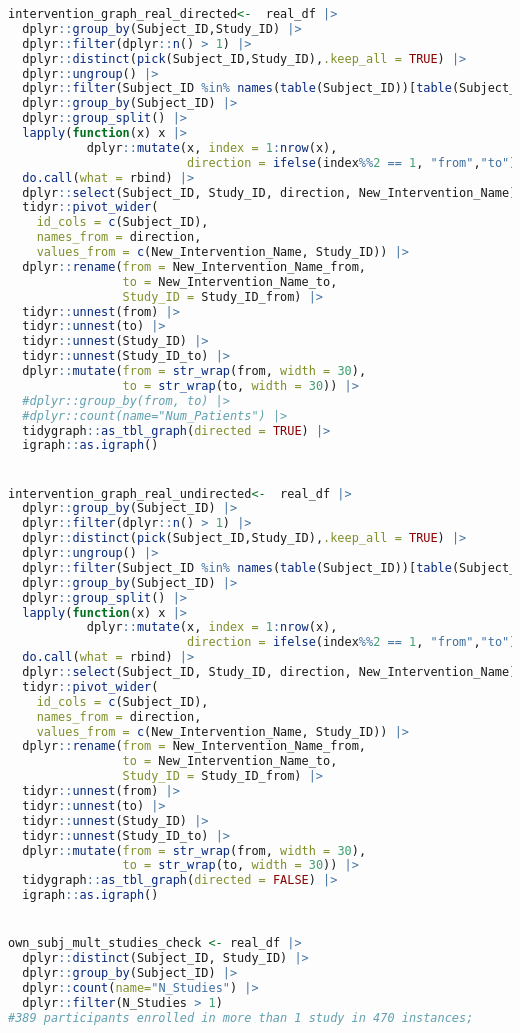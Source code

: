 \documentclass{article}
\begin{document}
\begin{lstlisting}[language=R]
intervention_graph_real_directed<-  real_df |>
  dplyr::group_by(Subject_ID,Study_ID) |>
  dplyr::filter(dplyr::n() > 1) |>
  dplyr::distinct(pick(Subject_ID,Study_ID),.keep_all = TRUE) |>
  dplyr::ungroup() |>
  dplyr::filter(Subject_ID %in% names(table(Subject_ID))[table(Subject_ID) > 1]) |>
  dplyr::group_by(Subject_ID) |>
  dplyr::group_split() |>
  lapply(function(x) x |>
           dplyr::mutate(x, index = 1:nrow(x),
                         direction = ifelse(index%%2 == 1, "from","to"))) |>
  do.call(what = rbind) |>
  dplyr::select(Subject_ID, Study_ID, direction, New_Intervention_Name) |>
  tidyr::pivot_wider(
    id_cols = c(Subject_ID),
    names_from = direction,
    values_from = c(New_Intervention_Name, Study_ID)) |>
  dplyr::rename(from = New_Intervention_Name_from,
                to = New_Intervention_Name_to,
                Study_ID = Study_ID_from) |>
  tidyr::unnest(from) |>
  tidyr::unnest(to) |>
  tidyr::unnest(Study_ID) |>
  tidyr::unnest(Study_ID_to) |>
  dplyr::mutate(from = str_wrap(from, width = 30),
                to = str_wrap(to, width = 30)) |>
  #dplyr::group_by(from, to) |>
  #dplyr::count(name="Num_Patients") |>
  tidygraph::as_tbl_graph(directed = TRUE) |>
  igraph::as.igraph()


intervention_graph_real_undirected<-  real_df |>
  dplyr::group_by(Subject_ID) |>
  dplyr::filter(dplyr::n() > 1) |>
  dplyr::distinct(pick(Subject_ID,Study_ID),.keep_all = TRUE) |>
  dplyr::ungroup() |>
  dplyr::filter(Subject_ID %in% names(table(Subject_ID))[table(Subject_ID) > 1]) |>
  dplyr::group_by(Subject_ID) |>
  dplyr::group_split() |>
  lapply(function(x) x |>
           dplyr::mutate(x, index = 1:nrow(x),
                         direction = ifelse(index%%2 == 1, "from","to"))) |>
  do.call(what = rbind) |>
  dplyr::select(Subject_ID, Study_ID, direction, New_Intervention_Name) |>
  tidyr::pivot_wider(
    id_cols = c(Subject_ID),
    names_from = direction,
    values_from = c(New_Intervention_Name, Study_ID)) |>
  dplyr::rename(from = New_Intervention_Name_from,
                to = New_Intervention_Name_to,
                Study_ID = Study_ID_from) |>
  tidyr::unnest(from) |>
  tidyr::unnest(to) |>
  tidyr::unnest(Study_ID) |>
  tidyr::unnest(Study_ID_to) |>
  dplyr::mutate(from = str_wrap(from, width = 30),
                to = str_wrap(to, width = 30)) |>
  tidygraph::as_tbl_graph(directed = FALSE) |>
  igraph::as.igraph()


own_subj_mult_studies_check <- real_df |>
  dplyr::distinct(Subject_ID, Study_ID) |>
  dplyr::group_by(Subject_ID) |>
  dplyr::count(name="N_Studies") |>
  dplyr::filter(N_Studies > 1)
#389 participants enrolled in more than 1 study in 470 instances;




\end{lstlisting}
\end{document}

